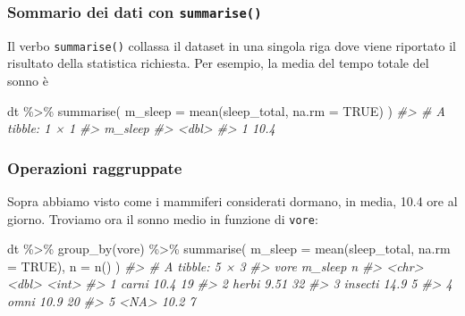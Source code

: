 \documentclass[
  10pt,
  italian,
  a4paper,
  extrafontsizes,onecolumn,openright
  ]{memoir}
\newenvironment{Shaded}{\begin{snugshade}}{\end{snugshade}}
\newcommand{\AttributeTok}[1]{\textcolor[rgb]{0.77,0.63,0.00}{#1}}
\newcommand{\CommentTok}[1]{\textcolor[rgb]{0.56,0.35,0.01}{\textit{#1}}}
\newcommand{\ConstantTok}[1]{\textcolor[rgb]{0.00,0.00,0.00}{#1}}
\newcommand{\FunctionTok}[1]{\textcolor[rgb]{0.00,0.00,0.00}{#1}}
\newcommand{\NormalTok}[1]{#1}
\newcommand{\SpecialCharTok}[1]{\textcolor[rgb]{0.00,0.00,0.00}{#1}}
\begin{document}
\hypertarget{sommario-dei-dati-con-summarise}{%
\subsubsection{\texorpdfstring{Sommario dei dati con \texttt{summarise()}}{Sommario dei dati con summarise()}}\label{sommario-dei-dati-con-summarise}}

Il verbo \texttt{summarise()} collassa il dataset in una singola riga dove viene riportato il risultato della statistica richiesta. Per esempio, la media del tempo totale del sonno è

\begin{Shaded}
\begin{Highlighting}[]
\NormalTok{dt }\SpecialCharTok{\%\textgreater{}\%} 
  \FunctionTok{summarise}\NormalTok{(}
    \AttributeTok{m\_sleep =} \FunctionTok{mean}\NormalTok{(sleep\_total, }\AttributeTok{na.rm =} \ConstantTok{TRUE}\NormalTok{)}
\NormalTok{  ) }
\CommentTok{\#\textgreater{} \# A tibble: 1 × 1}
\CommentTok{\#\textgreater{}   m\_sleep}
\CommentTok{\#\textgreater{}     \textless{}dbl\textgreater{}}
\CommentTok{\#\textgreater{} 1    10.4}
\end{Highlighting}
\end{Shaded}

\hypertarget{operazioni-raggruppate}{%
\subsubsection{Operazioni raggruppate}\label{operazioni-raggruppate}}

Sopra abbiamo visto come i mammiferi considerati dormano, in media, 10.4 ore al giorno. Troviamo ora il sonno medio in funzione di \texttt{vore}:

\begin{Shaded}
\begin{Highlighting}[]
\NormalTok{dt }\SpecialCharTok{\%\textgreater{}\%}
  \FunctionTok{group\_by}\NormalTok{(vore) }\SpecialCharTok{\%\textgreater{}\%}
  \FunctionTok{summarise}\NormalTok{(}
    \AttributeTok{m\_sleep =} \FunctionTok{mean}\NormalTok{(sleep\_total, }\AttributeTok{na.rm =} \ConstantTok{TRUE}\NormalTok{), }
    \AttributeTok{n =} \FunctionTok{n}\NormalTok{()}
\NormalTok{  )}
\CommentTok{\#\textgreater{} \# A tibble: 5 × 3}
\CommentTok{\#\textgreater{}   vore    m\_sleep     n}
\CommentTok{\#\textgreater{}   \textless{}chr\textgreater{}     \textless{}dbl\textgreater{} \textless{}int\textgreater{}}
\CommentTok{\#\textgreater{} 1 carni     10.4     19}
\CommentTok{\#\textgreater{} 2 herbi      9.51    32}
\CommentTok{\#\textgreater{} 3 insecti   14.9      5}
\CommentTok{\#\textgreater{} 4 omni      10.9     20}
\CommentTok{\#\textgreater{} 5 \textless{}NA\textgreater{}      10.2      7}
\end{Highlighting}
\end{Shaded}
\end{document}
